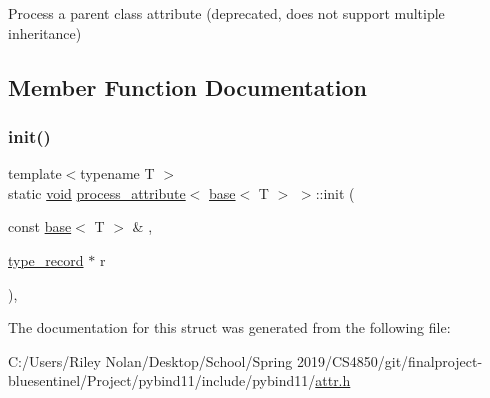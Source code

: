 Process a parent class attribute (deprecated, does not support multiple inheritance) 

\subsection{Member Function Documentation}
\mbox{\label{structprocess__attribute_3_01base_3_01_t_01_4_01_4_ae448bc67fd8ae68058eafcf6c9476598}} 
\subsubsection{\texorpdfstring{init()}{init()}}
{\footnotesize\ttfamily template$<$typename T $>$ \\
static \mbox{\hyperlink{_s_d_l__opengles2__gl2ext_8h_ae5d8fa23ad07c48bb609509eae494c95}{void}} \mbox{\hyperlink{structprocess__attribute}{process\+\_\+attribute}}$<$ \mbox{\hyperlink{structbase}{base}}$<$ T $>$ $>$\+::init (\begin{DoxyParamCaption}\item[{const \mbox{\hyperlink{structbase}{base}}$<$ T $>$ \&}]{,  }\item[{\mbox{\hyperlink{structtype__record}{type\+\_\+record}} $\ast$}]{r }\end{DoxyParamCaption})\hspace{0.3cm}{\ttfamily [inline]}, {\ttfamily [static]}}



The documentation for this struct was generated from the following file\+:\begin{DoxyCompactItemize}
\item 
C\+:/\+Users/\+Riley Nolan/\+Desktop/\+School/\+Spring 2019/\+C\+S4850/git/finalproject-\/bluesentinel/\+Project/pybind11/include/pybind11/\mbox{\hyperlink{attr_8h}{attr.\+h}}\end{DoxyCompactItemize}
